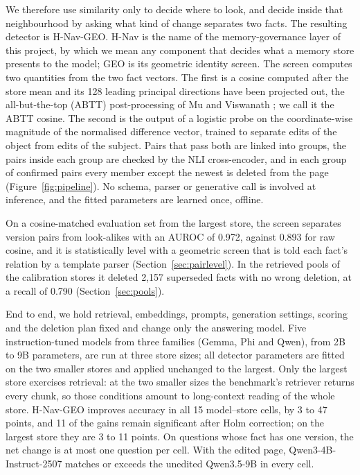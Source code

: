 \documentclass[11pt]{article}
\newcommand{\geo}{H-Nav-GEO}
\begin{document}
We therefore use similarity only to decide where to look, and decide inside that neighbourhood by asking what kind of change separates two facts. The resulting detector is \geo{}. H-Nav is the name of the memory-governance layer of this project, by which we mean any component that decides what a memory store presents to the model; GEO is its geometric identity screen. The screen computes two quantities from the two fact vectors. The first is a cosine computed after the store mean and its 128 leading principal directions have been projected out, the all-but-the-top (ABTT) post-processing of Mu and Viswanath \cite{mu2018abtt}; we call it the ABTT cosine. The second is the output of a logistic probe on the coordinate-wise magnitude of the normalised difference vector, trained to separate edits of the object from edits of the subject. Pairs that pass both are linked into groups, the pairs inside each group are checked by the NLI cross-encoder, and in each group of confirmed pairs every member except the newest is deleted from the page (Figure~\ref{fig:pipeline}). No schema, parser or generative call is involved at inference, and the fitted parameters are learned once, offline.

On a cosine-matched evaluation set from the largest store, the screen separates version pairs from look-alikes with an AUROC of 0.972, against 0.893 for raw cosine, and it is statistically level with a geometric screen that is told each fact's relation by a template parser (Section~\ref{sec:pairlevel}). In the retrieved pools of the calibration stores it deleted 2,157 superseded facts with no wrong deletion, at a recall of 0.790 (Section~\ref{sec:pools}).

End to end, we hold retrieval, embeddings, prompts, generation settings, scoring and the deletion plan fixed and change only the answering model. Five instruction-tuned models from three families (Gemma, Phi and Qwen), from 2B to 9B parameters, are run at three store sizes; all detector parameters are fitted on the two smaller stores and applied unchanged to the largest. Only the largest store exercises retrieval: at the two smaller sizes the benchmark's retriever returns every chunk, so those conditions amount to long-context reading of the whole store. \geo{} improves accuracy in all 15 model--store cells, by 3 to 47 points, and 11 of the gains remain significant after Holm correction; on the largest store they are 3 to 11 points. On questions whose fact has one version, the net change is at most one question per cell. With the edited page, Qwen3-4B-Instruct-2507 matches or exceeds the unedited Qwen3.5-9B in every cell.
\end{document}
